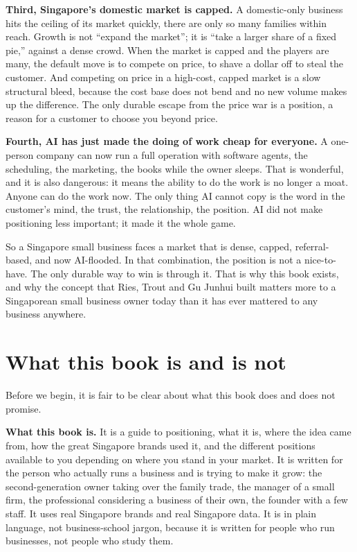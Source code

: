 \documentclass[10pt,twoside,openany]{memoir}
\begin{document}
\textbf{Third, Singapore's domestic market is capped.} A domestic-only
business hits the ceiling of its market quickly, there are only so many
families within reach. Growth is not ``expand the market''; it is ``take
a larger share of a fixed pie,'' against a dense crowd. When the market
is capped and the players are many, the default move is to compete on
price, to shave a dollar off to steal the customer. And competing on
price in a high-cost, capped market is a slow structural bleed, because
the cost base does not bend and no new volume makes up the difference.
The only durable escape from the price war is a position, a reason for a
customer to choose you beyond price.

\textbf{Fourth, AI has just made the doing of work cheap for everyone.}
A one-person company can now run a full operation with software agents,
the scheduling, the marketing, the books while the owner sleeps. That is
wonderful, and it is also dangerous: it means the ability to do the work
is no longer a moat. Anyone can do the work now. The only thing AI
cannot copy is the word in the customer's mind, the trust, the
relationship, the position. AI did not make positioning less important;
it made it the whole game.

So a Singapore small business faces a market that is dense, capped,
referral-based, and now AI-flooded. In that combination, the position is
not a nice-to-have. The only durable way to win is through it. That is
why this book exists, and why the concept that Ries, Trout and Gu Junhui
built matters more to a Singaporean small business owner today than it
has ever mattered to any business anywhere.

\FloatBarrier
\chapter{What this book is and is
not}\label{what-this-book-is-and-is-not}

Before we begin, it is fair to be clear about what this book does and
does not promise.

\textbf{What this book is.} It is a guide to positioning, what it is,
where the idea came from, how the great Singapore brands used it, and
the different positions available to you depending on where you stand in
your market. It is written for the person who actually runs a business
and is trying to make it grow: the second-generation owner taking over
the family trade, the manager of a small firm, the professional
considering a business of their own, the founder with a few staff. It
uses real Singapore brands and real Singapore data. It is in plain
language, not business-school jargon, because it is written for people
who run businesses, not people who study them.
\end{document}
